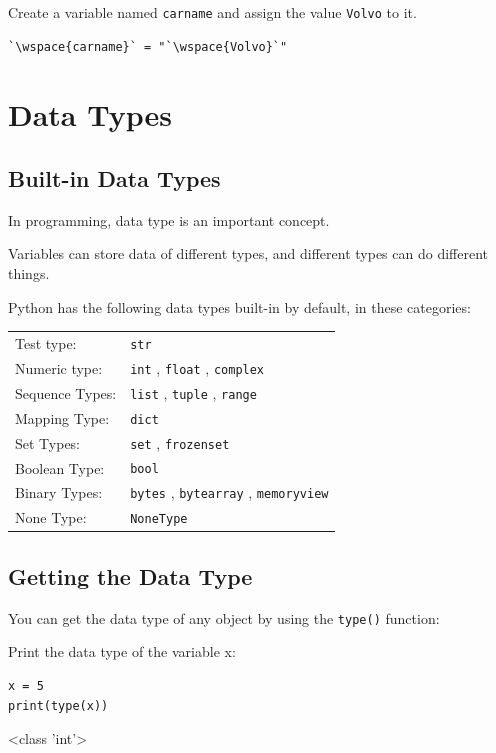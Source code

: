\documentclass[12pt,a4paper]{article}
\newcommand{\wspace}[1]{%
	\color{white}\colorbox{white}{\texttt{#1}}%
}
\newcommand{\code}[1]{%
	\colorbox{backcolour}{\lstinline{#1}}%
}
\newcommand{\lcode}[1]{%
	\lstinline{#1}%
}
\newcommand{\tcol}[2]{%
	\quad #1 & #2 \\
}
\begin{document}
\begin{tbox}
Create a variable named \code{carname} and assign the value \code{Volvo} to it.

	\begin{lstlisting}[numbers=none]
`\wspace{carname}` = "`\wspace{Volvo}`"
	\end{lstlisting}
\end{tbox}
\vfill\newpage
\section{Data Types}

\subsection{Built-in Data Types}

In programming, data type is an important concept.

Variables can store data of different types, and different types can do different things.

Python has the following data types built-in by default, in these categories:

\begin{table}[h]
		\begin{tabular}{ll}
			\tcol{Test type:}{\lcode{str}}
			\tcol{Numeric type:}{\lcode{int}, \lcode{float}, \lcode{complex}}
			\tcol{Sequence Types:}{\lcode{list}, \lcode{tuple}, \lcode{range}}
			\tcol{Mapping Type:}{\lcode{dict}}
			\tcol{Set Types:}{\lcode{set}, \lcode{frozenset}}
			\tcol{Boolean Type:}{\lcode{bool}}
			\tcol{Binary Types:}{\lcode{bytes}, \lcode{bytearray}, \lcode{memoryview}}
			\tcol{None Type:}{\lcode{NoneType}}
		\end{tabular}
\end{table}
\subsection{Getting the Data Type}

You can get the data type of any object by using the \code{type()} function:

\begin{ebox}
Print the data type of the variable x:

	\begin{lstlisting}
x = 5
print(type(x))
	\end{lstlisting}

\tcblower
	\begin{vercode}
<class 'int'>
	\end{vercode}
\end{ebox}
\vfill\newpage
\end{document}
